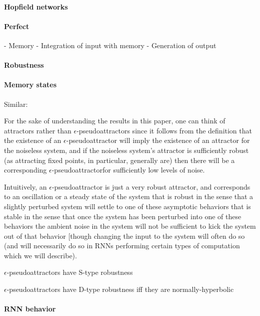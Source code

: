 \documentclass{scrartcl}
\theoremstyle{definition}
\theoremstyle{remark}
\begin{document}
\paragraph{Hopfield networks}
\citep{bernstein2017markov}


\paragraph{Perfect}
- Memory 
- Integration of input with memory
- Generation of output


\paragraph{Robustness}
\citep{Park2023a}



\paragraph{Memory states}
Similar: \citep{casey1996}

For the sake of understanding the results in this paper, one can think of attractors rather than $\epsilon$-pseudoattractors since it follows from the definition that the existence of an $\epsilon$-pseudoattractor will imply the existence of an attractor for the noiseless system, and if the noiseless system's attractor is sufficiently robust (as attracting fixed points, in particular, generally are) then there will be a corresponding $\epsilon$-pseudoattractorfor sufficiently low levels of noise.

Intuitively, an $\epsilon$-pseudoattractor is just a very robust attractor, and corresponds to an oscillation or a steady state of the system that is robust in the sense that a slightly perturbed system will settle to one of these asymptotic behaviors that is stable in the sense that once the system has been perturbed into one of these behaviors the ambient noise in the system will not be sufficient to kick the system out of that behavior [though changing the input to the system will often do so (and will necessarily do so in RNNs performing certain types of computation which we will describe).

$\epsilon$-pseudoattractors have S-type robustness

$\epsilon$-pseudoattractors have D-type robustness iff they are normally-hyperbolic



\paragraph{RNN behavior}
\citep{ceni2020interpreting}
\end{document}
